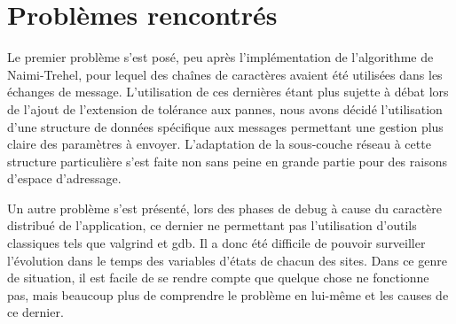 \section{Problèmes rencontrés}

Le premier problème s'est posé, peu après l'implémentation de l'algorithme de Naimi-Trehel, pour
lequel des chaînes de caractères avaient été utilisées dans les échanges de message. L'utilisation
de ces dernières étant plus sujette à débat lors de l'ajout de l'extension de tolérance aux pannes,
nous avons décidé l'utilisation d'une structure de données spécifique aux messages permettant une
gestion plus claire des paramètres à envoyer. L'adaptation de la sous-couche réseau à cette
structure particulière s'est faite non sans peine en grande partie pour des raisons d'espace
d'adressage.

Un autre problème s'est présenté, lors des phases de debug à cause du caractère distribué de
l'application, ce dernier ne permettant pas l'utilisation d'outils classiques tels que valgrind et
gdb. Il a donc été difficile de pouvoir surveiller l'évolution dans le temps des variables d'états
de chacun des sites. Dans ce genre de situation, il est facile de se rendre compte que quelque chose
ne fonctionne pas, mais beaucoup plus de comprendre le problème en lui-même et les causes de ce
dernier. 
